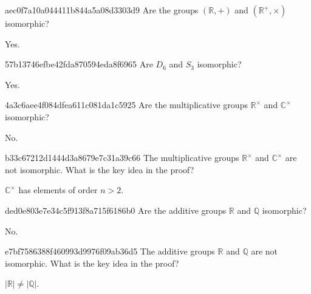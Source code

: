 \begin{note}{aec0f7a10a044411b844a5a08d3303d9}
    Are the groups \({ (\mathbb R, +) }\) and \({ (\mathbb R^{+}, \times) }\) isomorphic?

    \begin{cloze}{1}
        Yes.
    \end{cloze}
\end{note}

\begin{note}{57b13746efbe42fda870594eda8f6965}
    Are \({ D_6 }\) and \({ S_3 }\) isomorphic?

    \begin{cloze}{1}
        Yes.
    \end{cloze}
\end{note}

\begin{note}{4a3c6aee4f084dfea611c081da1c5925}
    Are the multiplicative groups \({ \mathbb R^{\times} }\) and \({ \mathbb C^{\times} }\) isomorphic?

    \begin{cloze}{1}
        No.
    \end{cloze}
\end{note}

\begin{note}{b33c67212d1444d3a8679e7c31a39c66}
    The multiplicative groups \({ \mathbb R^{\times} }\) and \({ \mathbb C^{\times} }\) are not isomorphic.
    What is the key idea in the proof?

    \begin{cloze}{1}
        \({ \mathbb C^{\times} }\) has elements of order \({ n > 2 }\).
    \end{cloze}
\end{note}

\begin{note}{ded0e803e7e34c5f913f8a715f6186b0}
    Are the additive groups \({ \mathbb R }\) and \({ \mathbb Q }\) isomorphic?

    \begin{cloze}{1}
        No.
    \end{cloze}
\end{note}

\begin{note}{e7bf7586388f460993d9976f09ab36d5}
    The additive groups \({ \mathbb R }\) and \({ \mathbb Q }\) are not isomorphic.
    What is the key idea in the proof?

    \begin{cloze}{1}
        \({ \left\lvert \mathbb R \right\rvert \neq \left\lvert \mathbb Q \right\rvert }\).
    \end{cloze}
\end{note}

